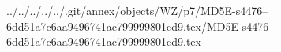 ../../../../../.git/annex/objects/WZ/p7/MD5E-s4476--6dd51a7c6aa9496741ac799999801ed9.tex/MD5E-s4476--6dd51a7c6aa9496741ac799999801ed9.tex